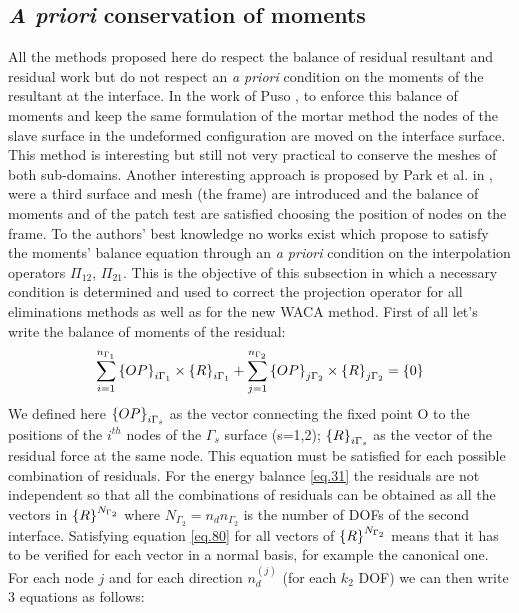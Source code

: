\subsection{\textit{A priori} conservation of moments}\label{ssec37}
All the methods proposed here do respect the balance of residual resultant and residual work but do not respect an \textit{a priori} condition on the moments of the resultant at the interface. In the work of Puso \cite{puso20043d}, to enforce this balance of moments and keep the same formulation of the mortar method the nodes of the slave surface in the undeformed configuration are moved on the interface surface. This method is interesting but still not very practical to conserve the meshes of both sub-domains. Another interesting approach is proposed by  Park et al. in \cite{park2002simpl}, were a third surface and mesh (the frame) are introduced and the balance of moments and of the patch test are satisfied choosing the position of nodes on the frame. To the authors' best knowledge no works exist which propose to satisfy the moments' balance equation through an \textit{a priori} condition on the interpolation operators $\Pi_{12}$, $\Pi_{21}$. This is the objective of this subsection in which a necessary condition is determined and used to correct the projection operator for all eliminations methods as well as for the new WACA method.
First of all let’s write the balance of moments of the residual:
\begin{equation}
\label{eq.80}
\sum_{i=1}^{n_{\Gamma_1}}\left\lbrace{OP}\right \rbrace_{i\Gamma_1}\times \left\lbrace{R}\right \rbrace_{i\Gamma_1}+\sum_{j=1}^{n_{\Gamma_2}}\left\lbrace{OP}\right \rbrace_{j\Gamma_2}\times \left\lbrace{R}\right \rbrace_{j\Gamma_2}=\left\lbrace{0}\right \rbrace
\end{equation}
We defined here $\left\lbrace{OP}\right \rbrace_{i\Gamma_s}$ as the vector connecting the fixed point O to the positions of the $i^{th}$ nodes of the $\Gamma_s$ surface (s=1,2); $\left\lbrace{R}\right \rbrace_{i\Gamma_s}$ as the vector of the residual force at the same node. This equation must be satisfied for each possible combination of residuals. For the energy balance \eqref{eq.31} the residuals are not independent so that all the combinations of residuals can be obtained as all the vectors in $\left\lbrace{R}\right \rbrace^{N_{\Gamma_2}}$ where $N_{\Gamma_2}=n_d n_{\Gamma_2}$ is the number of DOFs of the second interface. Satisfying equation \eqref{eq.80} for all vectors of $\left\lbrace{R}\right \rbrace^{N_{\Gamma_2}}$ means that it has to be verified for each vector in a normal basis, for example the canonical one.
For each node $j$ and for each direction $n_d^{(j)}$ (for each $k_2$ DOF) we can then write 3 equations as follows: 

